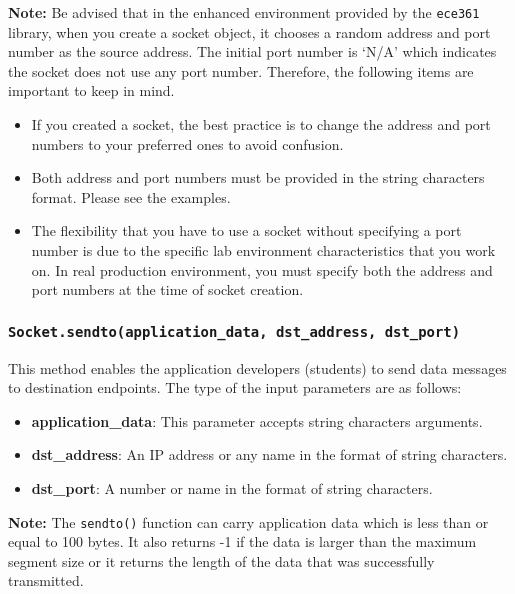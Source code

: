 \documentclass[11pt]{article}
\begin{document}
\textbf{Note:}
Be advised that in the enhanced environment provided by the \texttt{ece361} library, when you create a socket object, it chooses a random address and port number as the source address. The initial port number is ‘N/A' which indicates the socket does not use any port number. Therefore, the following items are important to keep in mind.
\begin{itemize}
    \item If you created a socket, the best practice is to change the address and port numbers to your preferred ones to avoid confusion.
    \item Both address and port numbers must be provided in the string characters format. Please see the examples.
    \item The flexibility that you have to use a socket without specifying a port number is due to the specific lab environment characteristics that you work on. In real production environment, you must specify both the address and port numbers at the time of socket creation.
\end{itemize}

\subsubsection{\texttt{Socket.sendto(application\_data, dst\_address, dst\_port)}}
This method enables the application developers (students) to send data messages to destination endpoints. The type of the input parameters are as follows:
\begin{itemize}
    \item \textbf{application\_data}: This parameter accepts string characters arguments.
    \item \textbf{dst\_address}: An IP address or any name in the format of string characters.
    \item \textbf{dst\_port}: A number or name in the format of string characters.
\end{itemize}

\textbf{Note:}
The \texttt{sendto()} function can carry application data which is less than or equal to 100 bytes. It also returns -1 if the data is larger than the maximum segment size or it returns the length of the data that was successfully transmitted.
\end{document}
